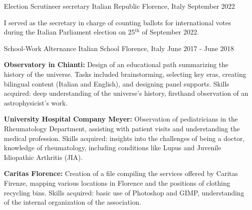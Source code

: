 \begin{cventries}
  \cventry
    {Election Scrutineer secretary} %
    {Italian Republic} %
    {Florence, Italy} %
    {September 2022} %
    {
      \begin{cvitems} %
        \item {I served as the secretary in charge of counting ballots for international votes during the Italian Parliament election on 25$^{\text{th}}$ of September 2022.}
      \end{cvitems}
    }

  \cventry
    {School-Work Alternance} %
    {Italian School} %
    {Florence, Italy} %
    {June 2017 - June 2018} %
    {
      \begin{cvitems} %
        \item {\textbf{Observatory in Chianti:}} Design of an educational path summarizing the history of the universe. Tasks included brainstorming, selecting key eras, creating bilingual content (Italian and English), and designing panel supports. Skills acquired: deep understanding of the universe's history, firsthand observation of an astrophysicist’s work.
        \item {\textbf{University Hospital Company Meyer:}} Observation of pediatricians in the Rheumatology Department, assisting with patient visits and understanding the medical profession. Skills acquired: insights into the challenges of being a doctor, knowledge of rheumatology, including conditions like Lupus and Juvenile Idiopathic Arthritis (JIA).
        \item {\textbf{Caritas Florence:}} Creation of a file compiling the services offered by Caritas Firenze, mapping various locations in Florence and the positions of clothing recycling bins. Skills acquired: basic use of Photoshop and GIMP, understanding of the internal organization of the association.
      \end{cvitems}
    }

\end{cventries}
